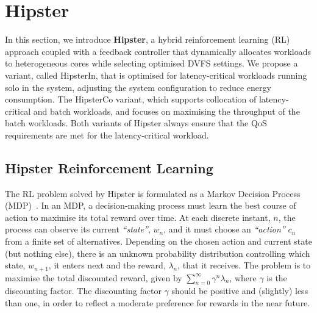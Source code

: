 \section{Hipster}%
\label{sec: methodology-hipster}


 In this section, we introduce \textbf{Hipster}, a hybrid reinforcement
learning (RL) approach coupled with a feedback controller that dynamically allocates
workloads to heterogeneous cores while selecting optimised DVFS settings.  We propose a
variant, called HipsterIn, that is optimised for latency-critical workloads running solo
in the system, adjusting the system configuration to reduce energy consumption. The
HipsterCo variant, which supports collocation of latency-critical and batch workloads, and
focuses on maximising the throughput of the batch workloads. Both variants of Hipster
always ensure that the QoS requirements are met for the latency-critical workload. 

\subsection{Hipster Reinforcement Learning} \label{subsec:learninng}

The RL problem solved by Hipster is formulated as a Markov Decision Process
(MDP)~\citep{Puterman:1994:MDP:528623}. In an MDP, a decision-making process must learn
the best course of action to maximise its total reward over time.  At each discrete
instant, $n$, the process can observe its current \emph{``state''}, $w_n$, and it must
choose an \emph{``action''} $c_n$ from a finite set of alternatives. Depending on the
chosen action and current state (but nothing else), there is an unknown probability
distribution controlling which state, $w_{n+1}$, it enters next and the reward, $\lambda_n$,
that it receives. The problem is to maximise the total discounted reward, given by
$\sum_{n=0}^{\infty} \gamma^n \lambda_n$, where $\gamma$ is the discounting factor. The
discounting factor $\gamma$ should be positive and (slightly) less than one, in order to
reflect a moderate preference for rewards in the near future. 




